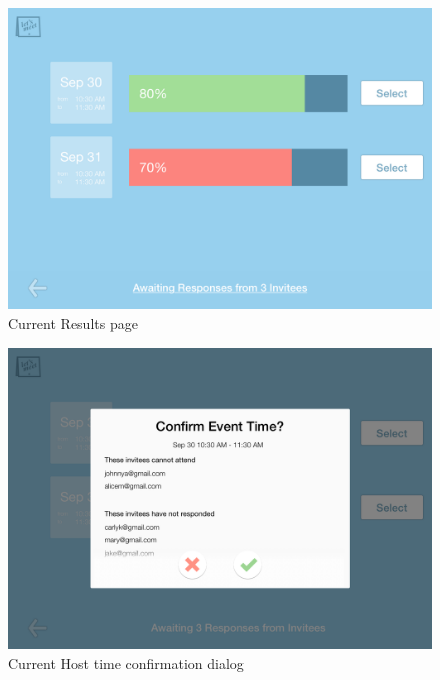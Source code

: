 \documentclass{sigchi}
\begin{document}
\begin{figure}
  \centering
  \includegraphics[width=1.75\columnwidth]{Mockup/Results}
  \caption{Current Results page}
\end{figure}

\begin{figure}
  \centering
  \includegraphics[width=1.75\columnwidth]{Mockup/ResultsSelectDialog}
  \caption{Current Host time confirmation dialog}
\end{figure}
\FloatBarrier




\balance{}

\newpage



\end{document}
